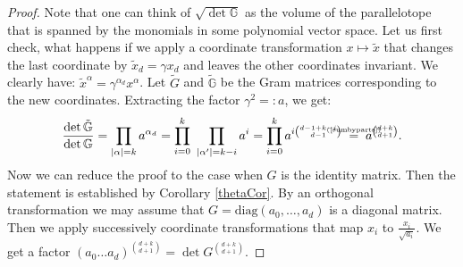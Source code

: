 \documentclass{amsart}
\newcommand{\myeq}[1]{\mathrel{\overset{\makebox[0pt]{\text{\tiny #1}}}{=}}}
\newcommand{\G}{\mathbb{G}}
\theoremstyle{plain}
\theoremstyle{definition}
\theoremstyle{remark}
\begin{document}
\begin{proof}
Note that one can think of $\sqrt{\det\G}$ as the volume of the parallelotope that is spanned by the monomials in some polynomial vector space.
Let us first check, what happens if we apply a coordinate transformation $x\mapsto\tilde x$ that changes the last coordinate by $\tilde{x}_d = \gamma x_d$ and leaves the other coordinates invariant. We clearly have: $\tilde{x}^\alpha = \gamma^{\alpha_d} x^\alpha$. Let $\tilde{G}$ and $\tilde{\G}$ be the Gram matrices corresponding to the new coordinates. Extracting the factor $\gamma^2 =:a$, we get:
$$
\frac{\det \tilde{\G}}{\det\G} = \prod_{|\alpha|=k}a^{\alpha_d} = \prod_{i=0}^k\ \prod_{|\alpha '|=k-i} a^i  =\prod_{i=0}^ka^{i\binom{d-1+k-i}{d-1}} \; \myeq{(\ref{sumbyparts})} \; a^{\binom{d+k}{d+1}}.
$$
Now we can reduce the proof to the case when $G$ is the identity matrix. Then the statement is established by Corollary \ref{thetaCor}. By an orthogonal transformation we may assume that $G= \text{diag}\left(a_0,\ldots,a_d\right)$ is a diagonal matrix. Then we apply successively coordinate transformations that map $x_i$ to $\frac{x_i}{\sqrt{a_i}}$. We get a factor $(a_0\ldots a_d)^{\binom{d+k}{d+1}} = \det G^{\binom{d+k}{d+1}}$.
\end{proof}
\end{document}
